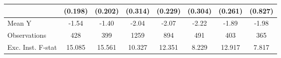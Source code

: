 {\begin{tabular}{l*{7}{c}}
            &     (0.198)         &     (0.202)         &     (0.314)         &     (0.229)         &     (0.304)         &     (0.261)         &     (0.827)         \\
\midrule
Mean Y      &       -1.54         &       -1.40         &       -2.04         &       -2.07         &       -2.22         &       -1.89         &       -1.98         \\
Observations&         428         &         399         &        1259         &         894         &         491         &         403         &         365         \\
Exc. Inst. F-stat&      15.085         &      15.561         &      10.327         &      12.351         &       8.229         &      12.917         &       7.817         \\
\bottomrule
\end{tabular}
}
